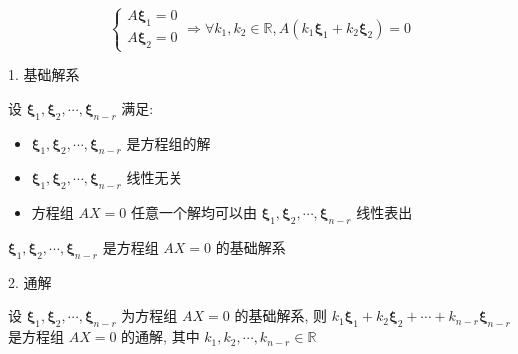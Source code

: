 \begin{corollary}[解的性质]
	$$\begin{cases}
	  A\boldsymbol{\xi}_{1} = 0\\
	  A\boldsymbol{\xi}_{2} = 0
	\end{cases}\Rightarrow \forall k_{1},k_{2}\in \mathbb{R}, A(k_{1}\boldsymbol{\xi}_{1}+k_{2}\boldsymbol{\xi}_{2})=0$$
\end{corollary}

\begin{definition}[基础解系和通解]
	
	1. 基础解系
	
	设 $\boldsymbol{\xi}_{1},\boldsymbol{\xi}_{2},\cdots,\boldsymbol{\xi}_{n-r}$ 满足:  
	\begin{itemize}
		\item $\boldsymbol{\xi}_{1},\boldsymbol{\xi}_{2},\cdots,\boldsymbol{\xi}_{n-r}$ 是方程组的解
		\item $\boldsymbol{\xi}_{1},\boldsymbol{\xi}_{2},\cdots,\boldsymbol{\xi}_{n-r}$ 线性无关
		\item 方程组 $AX=0$ 任意一个解均可以由 $\boldsymbol{\xi}_{1},\boldsymbol{\xi}_{2},\cdots,\boldsymbol{\xi}_{n-r}$ 线性表出
	\end{itemize}
	
	$\boldsymbol{\xi}_{1},\boldsymbol{\xi}_{2},\cdots,\boldsymbol{\xi}_{n-r}$ 是方程组 $AX=0$ 的基础解系
	
	2. 通解
	
	设 $\boldsymbol{\xi}_{1},\boldsymbol{\xi}_{2},\cdots,\boldsymbol{\xi}_{n-r}$ 为方程组 $AX=0$ 的基础解系, 则 $k_{1}\boldsymbol{\xi}_{1} + k_{2}\boldsymbol{\xi}_{2} + \cdots + k_{n-r}\boldsymbol{\xi}_{n-r}$ 是方程组 $AX=0$ 的通解, 
	其中 $k_{1},k_{2},\cdots,k_{n-r}\in \mathbb{R}$
\end{definition}
